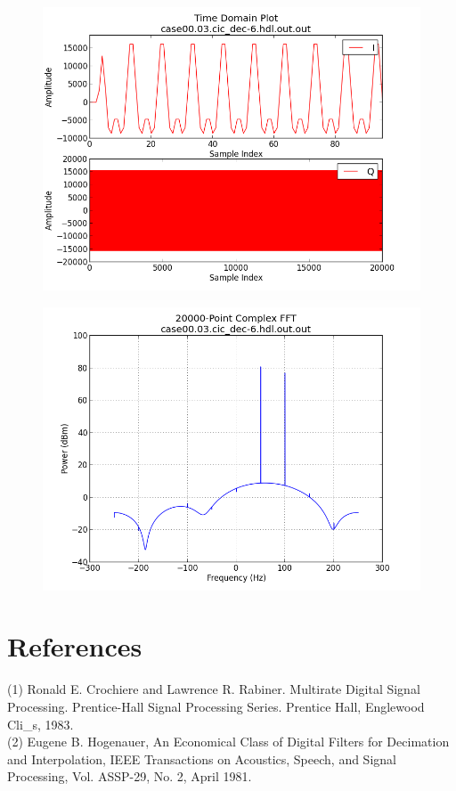 \documentclass{article}
\begin{document}
	\begin{figure}[ht]
		\centering
		\begin{minipage}{.5\textwidth}
			\centering\includegraphics[width=1.0\linewidth]{output_time_R2048}
			\label{fig:output_time_R2048}
		\end{minipage}%
		\begin{minipage}{.5\textwidth}
			\centering\includegraphics[width=1.0\linewidth]{output_freq_R2048}
			\label{fig:output_freq_R2048}
		\end{minipage}
	\end{figure}


\section*{References}
(1)	Ronald E. Crochiere and Lawrence R. Rabiner. Multirate Digital Signal Processing. Prentice-Hall Signal Processing Series. Prentice Hall, Englewood Cli\_s, 1983. \\
(2)	Eugene B. Hogenauer, An Economical Class of Digital Filters for Decimation and Interpolation, IEEE Transactions on Acoustics, Speech, and Signal Processing, Vol. ASSP-29, No. 2, April 1981.
\end{document}
